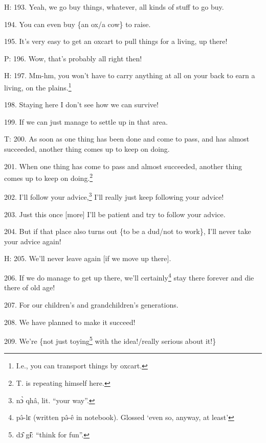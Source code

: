 H: 193. Yeah, we go buy things, whatever, all kinds of stuff to go buy.

194. You can even buy \{an ox/a cow\} to raise.

195. It's very easy to get an oxcart to pull things for a living, up there!

P: 196. Wow, that's probably all right then!

H: 197. Mm-hm, you won't have to carry anything at all on your back to earn a living,
on the plains.\footnote{I.e., you can transport things by oxcart.}

198. Staying here I don't see how we can survive!

199. If we can just manage to settle up in that area.

T: 200. As soon as one thing has been done and come to pass, and has almost succeeded,
another thing comes up to keep on doing.

201. When one thing has come to pass and almost succeeded, another thing comes
up to keep on doing.\footnote{T. is repeating himself here.}

202. I'll follow your advice,\footnote{nɔ̀ qhâ, lit. ``your way''.} I'll really just keep following your advice!

203. Just this once [more] I'll be patient and try to follow your advice.

204. But if that place also turns out \{to be a dud/not to work\}, I'll never take
your advice again!

H: 205. We'll never leave again [if we move up there].

206. If we do manage to get up there, we'll certainly\footnote{pə̂-lɛ (written pə̂-ê in notebook). Glossed `even so, anyway, at least'} stay there forever and
die there of old age!

207. For our children's and grandchildren's generations.

208. We have planned to make it succeed!

209. We're \{not just toying\footnote{dɔ̂ gɨ̂: ``think for fun''.} with the idea!/really serious about it!\}

